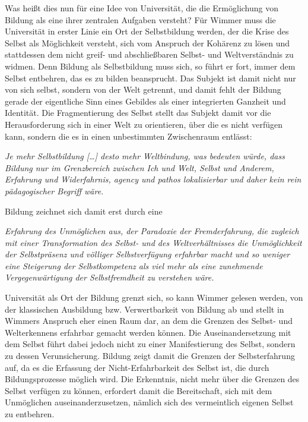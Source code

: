 Was heißt dies nun für eine Idee von Universität,
die die Ermöglichung von Bildung als eine ihrer zentralen Aufgaben versteht?
Für Wimmer muss die Universität in erster Linie ein Ort der Selbstbildung
werden, der die Krise des Selbst als Möglichkeit versteht, sich vom Anspruch
der Kohärenz zu lösen und stattdessen dem nicht greif- und abschließbaren
Selbst- und Weltverständnis zu widmen.  Denn Bildung als Selbstbildung muss
sich, so führt er fort, immer dem Selbst entbehren, das es zu bilden
beansprucht. Das Subjekt ist damit nicht nur von sich selbst, sondern von der
Welt getrennt, und damit fehlt der Bildung \glqq gerade der eigentliche Sinn eines
Gebildes als einer integrierten Ganzheit und Identität.\grqq\footnotemark {}  Die Fragmentierung
des Selbst stellt das Subjekt damit vor die Herausforderung sich in einer Welt
zu orientieren, über die es nicht verfügen kann, sondern die es in einen
unbestimmten Zwischenraum entlässt: 
\begin{myenv}
  \textit{ \glqq Je mehr Selbstbildung […] desto mehr
Weltbindung, was bedeuten würde, dass Bildung nur im Grenzbereich zwischen Ich
und Welt, Selbst und Anderem, Erfahrung und Widerfahrnis, agency und pathos
lokalisierbar und daher kein rein pädagogischer Begriff wäre.\grqq}
\footnotemark {}  
\end{myenv}

Bildung
zeichnet sich damit erst durch eine 
\begin{myenv}
  \textit{\glqq [...]Erfahrung des Unmöglichen aus, der
Paradoxie der Fremderfahrung, die zugleich mit einer Transformation des Selbst-
und des Weltverhältnisses die Unmöglichkeit der Selbstpräsenz und völliger
Selbstverfügung erfahrbar macht und so weniger eine Steigerung der
Selbstkompetenz als viel mehr als eine zunehmende Vergegenwärtigung der
Selbstfremdheit zu verstehen wäre.\grqq}
\footnotemark {}  
\end{myenv}

Universität als Ort der Bildung grenzt sich, so kann Wimmer gelesen werden, von
der klassischen Ausbildung bzw. Verwertbarkeit von Bildung ab und stellt in
Wimmers Anspruch eher einen Raum dar, an dem die Grenzen des Selbst- und
Welterkennens erfahrbar gemacht werden können. Die Auseinandersetzung mit dem
Selbst führt dabei jedoch nicht zu einer Manifestierung des Selbst, sondern zu
dessen Verunsicherung. Bildung zeigt damit die Grenzen der Selbsterfahrung auf,
da es die Erfassung der Nicht-Erfahrbarkeit des Selbst ist, die durch
Bildungsprozesse möglich wird. Die Erkenntnis, nicht mehr über die Grenzen des
Selbst verfügen zu können, erfordert damit die Bereitschaft, sich mit dem
Unmöglichen auseinanderzusetzen, nämlich sich des vermeintlich eigenen Selbst
zu entbehren.  

